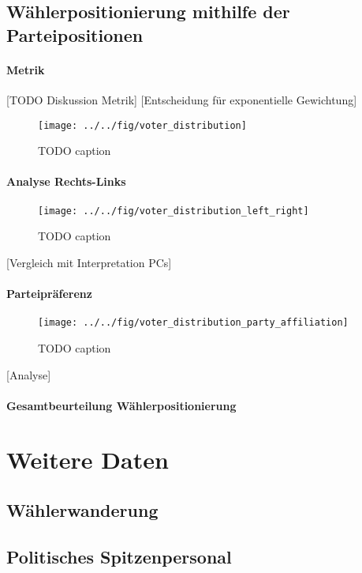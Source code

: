 \subsection{Wählerpositionierung mithilfe der Parteipositionen}
\paragraph{Metrik}
[TODO Diskussion Metrik]
[Entscheidung für exponentielle Gewichtung]
\begin{figure}[htb]
	\centering
	\texttt{[image: ../../fig/voter\_distribution]}
	\caption{TODO caption}
	\label{fig:voter-positions-pca}
\end{figure}

\paragraph{Analyse Rechts-Links}
\begin{figure}[htb]
	\centering
	\texttt{[image: ../../fig/voter\_distribution\_left\_right]}
	\caption{TODO caption}
	\label{fig:voter-positions-pca-left-right}
\end{figure}
[Vergleich mit Interpretation PCs]

\paragraph{Parteipräferenz}
\begin{figure}[htb]
	\centering
	\texttt{[image: ../../fig/voter\_distribution\_party\_affiliation]}
	\caption{TODO caption}
	\label{fig:voter-positions-pca-party-affiliation}
\end{figure}
[Analyse]

\paragraph{Gesamtbeurteilung Wählerpositionierung}


\section{Weitere Daten}\label{Sec-Weitere-Daten}

\subsection{Wählerwanderung}\label{Sec-Wählerwanderung}

\subsection{Politisches Spitzenpersonal}\label{Sec-Spitzenpersonal}

